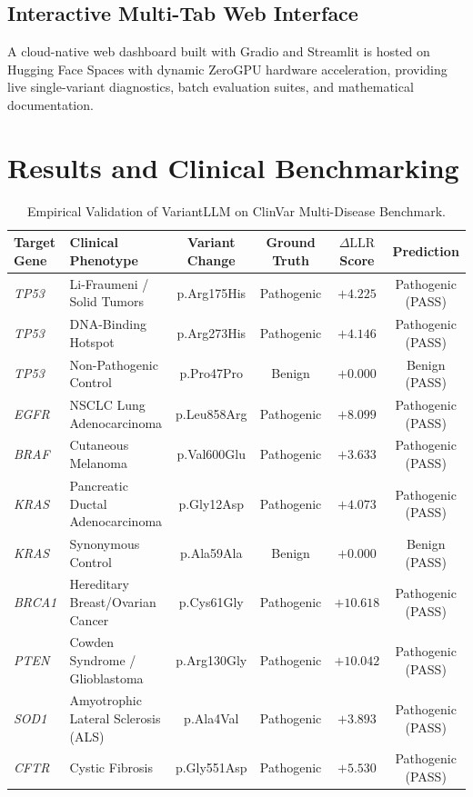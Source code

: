 \documentclass[10pt,twocolumn,letterpaper]{article}
\begin{document}
\subsection{Interactive Multi-Tab Web Interface}
A cloud-native web dashboard built with Gradio and Streamlit is hosted on Hugging Face Spaces with dynamic ZeroGPU hardware acceleration, providing live single-variant diagnostics, batch evaluation suites, and mathematical documentation.

\section{Results and Clinical Benchmarking}

\begin{table}[t]
\centering
\caption{Empirical Validation of VariantLLM on ClinVar Multi-Disease Benchmark.}
\label{tab:benchmarks}
\small
\begin{tabular}{llcccc}
\toprule
\textbf{Target Gene} & \textbf{Clinical Phenotype} & \textbf{Variant Change} & \textbf{Ground Truth} & \textbf{$\Delta\text{LLR}$ Score} & \textbf{Prediction} \\
\midrule
\textit{TP53} & Li-Fraumeni / Solid Tumors & p.Arg175His & Pathogenic & $+4.225$ & Pathogenic (PASS) \\
\textit{TP53} & DNA-Binding Hotspot & p.Arg273His & Pathogenic & $+4.146$ & Pathogenic (PASS) \\
\textit{TP53} & Non-Pathogenic Control & p.Pro47Pro & Benign & $+0.000$ & Benign (PASS) \\
\textit{EGFR} & NSCLC Lung Adenocarcinoma & p.Leu858Arg & Pathogenic & $+8.099$ & Pathogenic (PASS) \\
\textit{BRAF} & Cutaneous Melanoma & p.Val600Glu & Pathogenic & $+3.633$ & Pathogenic (PASS) \\
\textit{KRAS} & Pancreatic Ductal Adenocarcinoma & p.Gly12Asp & Pathogenic & $+4.073$ & Pathogenic (PASS) \\
\textit{KRAS} & Synonymous Control & p.Ala59Ala & Benign & $+0.000$ & Benign (PASS) \\
\textit{BRCA1} & Hereditary Breast/Ovarian Cancer & p.Cys61Gly & Pathogenic & $+10.618$ & Pathogenic (PASS) \\
\textit{PTEN} & Cowden Syndrome / Glioblastoma & p.Arg130Gly & Pathogenic & $+10.042$ & Pathogenic (PASS) \\
\textit{SOD1} & Amyotrophic Lateral Sclerosis (ALS) & p.Ala4Val & Pathogenic & $+3.893$ & Pathogenic (PASS) \\
\textit{CFTR} & Cystic Fibrosis & p.Gly551Asp & Pathogenic & $+5.530$ & Pathogenic (PASS) \\
\bottomrule
\end{tabular}
\end{table}
\end{document}
